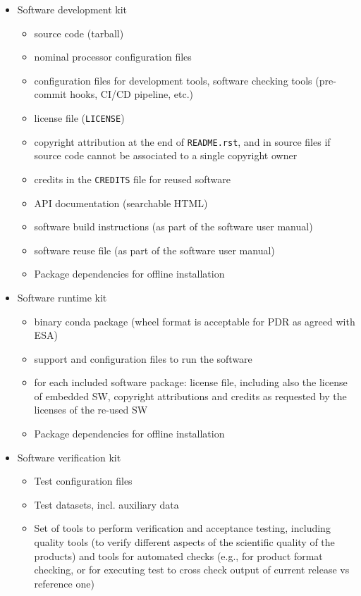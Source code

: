 \begin{itemize}
    \item Software development kit
        \begin{itemize}
            \item source code (tarball)
            \item nominal processor configuration files
            \item configuration files for development tools, software checking tools (pre-commit hooks, CI/CD pipeline, etc.)
            \item license file (\texttt{LICENSE})
            \item copyright attribution at the end of \texttt{README.rst}, and in source files if source code cannot be associated to a single copyright owner
            \item credits in the \texttt{CREDITS} file for reused software
            \item API documentation (searchable HTML)
            \item software build instructions (as part of the software user manual)
            \item software reuse file (as part of the software user manual)
            \item Package dependencies for offline installation
        \end{itemize}

    \item Software runtime kit
         \begin{itemize}
             \item binary conda package (wheel format is acceptable for PDR as agreed with ESA)
             \item support and configuration files to run the software
             \item for each included software package: license file, including also the license of embedded SW, copyright attributions and credits as requested by the licenses of the re-used SW 
             \item Package dependencies for offline installation
         \end{itemize}

    \item Software verification kit
        \begin{itemize}
            \item Test configuration files
            \item Test datasets, incl. auxiliary data
            \item Set of tools to perform verification and acceptance testing, including quality tools (to verify different aspects of the scientific quality of the products) and tools for automated checks (e.g., for product format checking, or for executing test to cross check output of current release vs reference one)
        \end{itemize}


\end{itemize}

